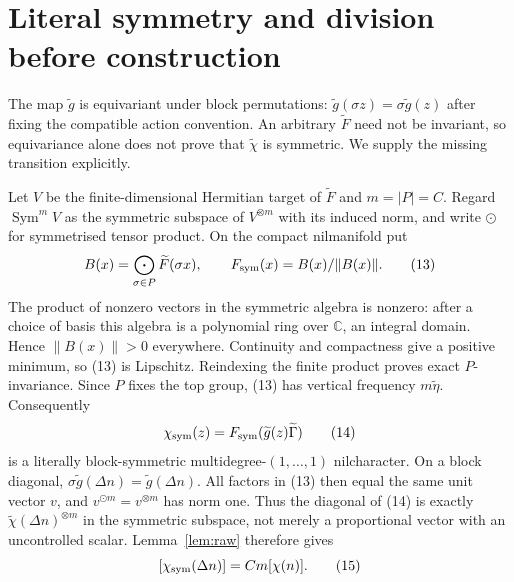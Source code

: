\documentclass[11pt]{article}
\newcommand{\C}{\mathbb C}\newcommand{\g}{\mathfrak g}
\newcommand{\Sym}{\operatorname{Sym}}\newcommand{\poly}{\operatorname{poly}}
\begin{document}
\section{Literal symmetry and division before construction}\label{sec:symmetry}
The map $\widetilde g$ is equivariant under block permutations:
$\widetilde g(\sigma z)=\sigma\widetilde g(z)$ after fixing the compatible
action convention. An arbitrary $\widetilde F$ need not be invariant,
so equivariance alone does not prove that $\widetilde\chi$ is symmetric.
We supply the missing transition explicitly.

Let $V$ be the finite-dimensional Hermitian target of $\widetilde F$ and
$m=|P|=C$. Regard $\Sym^m V$ as the symmetric subspace of $V^{\otimes m}$
with its induced norm, and write $\odot$ for symmetrised tensor product.
On the compact nilmanifold put
\[
 B(x)=\mathop{\bigodot}_{\sigma\in P}\widetilde F(\sigma x),
 \qquad F_{\rm sym}(x)=B(x)/\|B(x)\|.                    \tag{13}
\]
The product of nonzero vectors in the symmetric algebra is nonzero:
after a choice of basis this algebra is a polynomial ring over $\C$,
an integral domain. Hence $\|B(x)\|>0$ everywhere. Continuity and
compactness give a positive minimum, so (13) is Lipschitz. Reindexing
the finite product proves exact $P$-invariance. Since $P$ fixes the top
group, (13) has vertical frequency $m\widetilde\eta$.
Consequently
\[
 \chi_{\rm sym}(z)=F_{\rm sym}(\widetilde g(z)\widetilde\Gamma)
                                                        \tag{14}
\]
is a literally block-symmetric multidegree-$(1,\ldots,1)$ nilcharacter.
On a block diagonal, $\sigma\widetilde g(\Delta n)=\widetilde g(\Delta n)$.
All factors in (13) then equal the same unit vector $v$, and
$v^{\odot m}=v^{\otimes m}$ has norm one. Thus the diagonal of (14)
is exactly $\widetilde\chi(\Delta n)^{\otimes m}$ in the symmetric
subspace, not merely a proportional vector with an uncontrolled scalar.
Lemma~\ref{lem:raw} therefore gives
\[
 [\chi_{\rm sym}(\Delta n)]=Cm[\chi(n)].                 \tag{15}
\]
\end{document}
